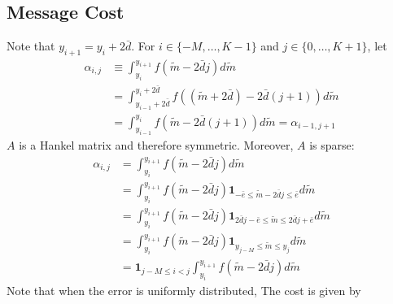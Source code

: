 \documentclass[12pt]{article}
\begin{document}
\subsection{Message Cost}
Note that $y_{i+1}=y_{i}+2\bar{d}$. For $i\in\{-M,\ldots,K-1\}$ and $j\in\{0,\ldots,K+1\}$, let
\begin{align}
	\alpha_{i,j}&\equiv\int_{y_{i}}^{y_{i+1}}{f(\widetilde{m}-2\bar{d}j)d\widetilde{m}}\label{eq:alpha}\\
	&=\int_{y_{i-1}+2\bar{d}}^{y_{i}+2\bar{d}}{f((\widetilde{m}+2\bar{d})-2\bar{d}(j+1))d\widetilde{m}}\\
	&=\int_{y_{i-1}}^{y_{i}}{f(\widetilde{m}-2\bar{d}(j+1))d\widetilde{m}}=\alpha_{i-1,j+1}
\end{align}
$A$ is a Hankel matrix and therefore symmetric. Moreover, $A$ is sparse:
\begin{align}
	\alpha_{i,j}&=\int_{y_{i}}^{y_{i+1}}{f(\widetilde{m}-2\bar{d}j)d\widetilde{m}}\\
	&=\int_{y_{i}}^{y_{i+1}}{f(\widetilde{m}-2\bar{d}j)\mathbf{1}_{-\bar{e}\leq\widetilde{m}-2\bar{d}j\leq\bar{e}}d\widetilde{m}}\\
	&=\int_{y_{i}}^{y_{i+1}}{f(\widetilde{m}-2\bar{d}j)\mathbf{1}_{2\bar{d}j-\bar{e}\leq\widetilde{m}\leq 2\bar{d}j+\bar{e}}d\widetilde{m}}\\
	&=\int_{y_{i}}^{y_{i+1}}{f(\widetilde{m}-2\bar{d}j)\mathbf{1}_{y_{j-M}\leq\widetilde{m}\leq y_{j}}d\widetilde{m}}\\
	&=\mathbf{1}_{j-M\leq i<j}\int_{y_{i}}^{y_{i+1}}{f(\widetilde{m}-2\bar{d}j)d\widetilde{m}}
\end{align}
Note that when the error is uniformly distributed, The cost is given by 
\end{document}
